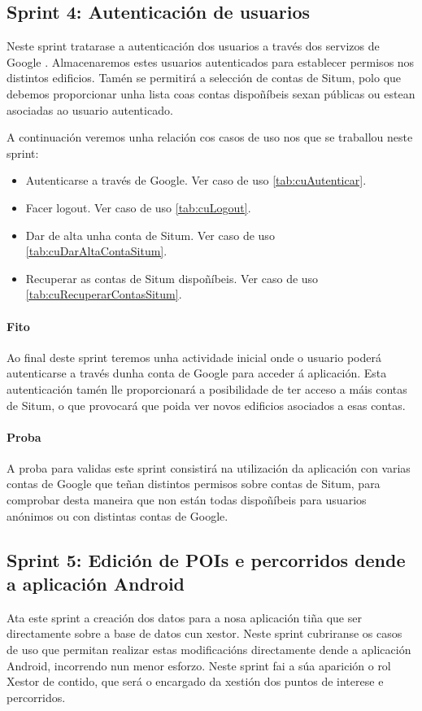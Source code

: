 \subsection{Sprint 4: Autenticación de usuarios}
Neste sprint tratarase a autenticación dos usuarios a través dos servizos de Google \cite{googleSignIn}. Almacenaremos estes usuarios autenticados para establecer permisos nos distintos edificios. Tamén se permitirá a selección de contas de Situm, polo que debemos proporcionar unha lista coas contas dispoñíbeis sexan públicas ou estean asociadas ao usuario autenticado.

A continuación veremos unha relación cos casos de uso nos que se traballou neste sprint:

\begin{itemize}
	\item Autenticarse a través de Google. Ver caso de uso \ref{tab:cuAutenticar}.
	\item Facer logout. Ver caso de uso \ref{tab:cuLogout}.
	\item Dar de alta unha conta de Situm. Ver caso de uso \ref{tab:cuDarAltaContaSitum}.
	\item Recuperar as contas de Situm dispoñíbeis. Ver caso de uso \ref{tab:cuRecuperarContasSitum}.
\end{itemize}

\paragraph{Fito}
Ao final deste sprint teremos unha actividade inicial onde o usuario poderá autenticarse a través dunha conta de Google para acceder á aplicación. Esta autenticación tamén lle proporcionará a posibilidade de ter acceso a máis contas de Situm, o que provocará que poida ver novos edificios asociados a esas contas.

\paragraph{Proba}
A proba para validas este sprint consistirá na utilización da aplicación con varias contas de Google que teñan distintos permisos sobre contas de Situm, para comprobar desta maneira que non están todas dispoñíbeis para usuarios anónimos ou con distintas contas de Google.

\subsection{Sprint 5: Edición de POIs e percorridos dende a aplicación Android}
Ata este sprint a creación dos datos para a nosa aplicación tiña que ser directamente sobre a base de datos cun xestor. Neste sprint cubriranse os casos de uso que permitan realizar estas modificacións directamente dende a aplicación Android, incorrendo nun menor esforzo. Neste sprint fai a súa aparición o rol Xestor de contido, que será o encargado da xestión dos puntos de interese e percorridos.

